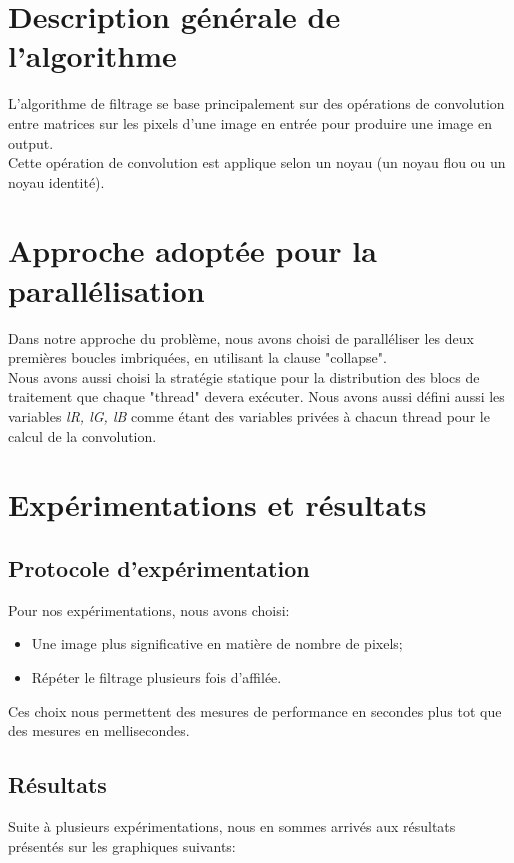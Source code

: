 \documentclass{report}
\begin{document}
\section{Description générale de l'algorithme}
L'algorithme de filtrage se base principalement sur des opérations de convolution entre matrices
 sur les pixels d'une image en entrée pour produire une image en output.\\
Cette opération de convolution est applique selon un noyau (un noyau flou ou un noyau identité).
\section{Approche adoptée pour la parallélisation }
Dans notre approche du problème, nous avons choisi de paralléliser les deux premières
boucles imbriquées, en utilisant la clause "collapse".\\
Nous avons aussi choisi la stratégie statique pour la distribution des blocs de traitement
que chaque "thread" devera exécuter. Nous avons aussi défini aussi les variables {\it lR, lG, lB} 
comme étant des variables privées à chacun thread pour le calcul de la convolution.
\section{Expérimentations et résultats}
\subsection{Protocole d'expérimentation}
Pour nos expérimentations, nous avons choisi:
\begin{itemize}
	\item Une image plus significative en matière de nombre de pixels;
	\item Répéter le filtrage plusieurs fois d'affilée.
\end{itemize}
Ces choix nous permettent des mesures de performance en secondes plus
tot que des mesures en mellisecondes.

\subsection{Résultats}

\bigskip Suite à plusieurs expérimentations, nous en sommes arrivés aux résultats présentés sur les graphiques suivants:
\end{document}
